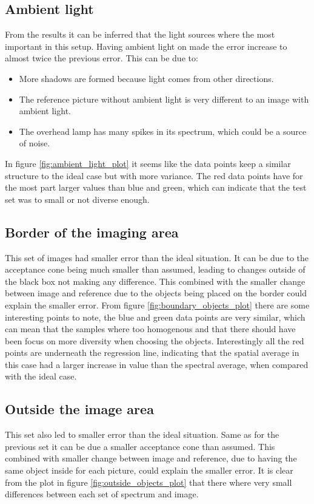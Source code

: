 \subsection{Ambient light}
From the results it can be inferred that the light sources where the most important in this setup. Having ambient light on made the error increase to almost twice the previous error. This can be due to: 
\begin{itemize}
    \item More shadows are formed because light comes from other directions. 
    \item The reference picture without ambient light is very different to an image with ambient light. 
    \item The overhead lamp has many spikes in its spectrum, which could be a source of noise. 
\end{itemize}
In figure \ref{fig:ambient_light_plot} it seems like the data points keep a similar structure to the ideal case but with more variance. The red data points have for the most part larger values than blue and green, which can indicate that the test set was to small or not diverse enough.


\subsection{Border of the imaging area} 
This set of images had smaller error than the ideal situation. It can be due to the acceptance cone being much smaller than assumed, leading to changes outside of the black box not making any difference. This combined with the smaller change between image and reference due to the objects being placed on the border could explain the smaller error. From figure \ref{fig:boundary_objects_plot} there are some interesting points to note, the blue and green data points are very similar, which can mean that the samples where too homogenous and that there should have been focus on more diversity when choosing the objects. Interestingly all the red points are underneath the regression line, indicating that the spatial average in this case had a larger increase in value than the spectral average, when compared with the ideal case. 

\subsection{Outside the image area}
This set also led to smaller error than the ideal situation. Same as for the previous set it can be due a smaller acceptance cone than assumed. This combined with smaller change between image and reference, due to having the same object inside for each picture, could explain the smaller error. It is clear from the plot in figure \ref{fig:outside_objects_plot} that there where very small differences between each set of spectrum and image. 

